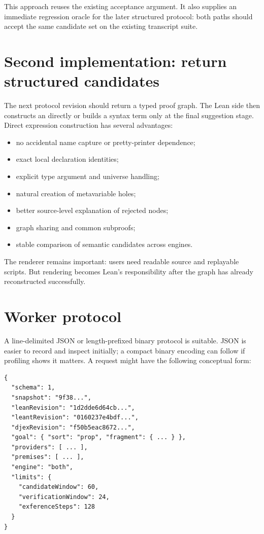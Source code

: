 \documentclass[11pt,letterpaper,openany]{report}
\newcommand{\code}[1]{\texttt{\detokenize{#1}}}
\begin{document}
This approach reuses the existing acceptance argument. It also supplies an immediate
regression oracle for the later structured protocol: both paths should accept the same
candidate set on the existing transcript suite.

\section{Second implementation: return structured candidates}

The next protocol revision should return a typed proof graph. The Lean side then
constructs an \code{Expr} directly or builds a syntax term only at the final suggestion
stage. Direct expression construction has several advantages:

\begin{itemize}
  \item no accidental name capture or pretty-printer dependence;
  \item exact local declaration identities;
  \item explicit type argument and universe handling;
  \item natural creation of metavariable holes;
  \item better source-level explanation of rejected nodes;
  \item graph sharing and common subproofs;
  \item stable comparison of semantic candidates across engines.
\end{itemize}

The renderer remains important: users need readable source and replayable scripts.
But rendering becomes Lean's responsibility after the graph has already reconstructed
successfully.

\section{Worker protocol}

A line-delimited JSON or length-prefixed binary protocol is suitable. JSON is easier to
record and inspect initially; a compact binary encoding can follow if profiling shows
it matters. A request might have the following conceptual form:

\begin{lstlisting}[language=JSONLite,caption={Illustrative Leant worker request}]
{
  "schema": 1,
  "snapshot": "9f38...",
  "leanRevision": "1d2dde6d64cb...",
  "leantRevision": "0160237e4bdf...",
  "djexRevision": "f50b5eac8672...",
  "goal": { "sort": "prop", "fragment": { ... } },
  "providers": [ ... ],
  "premises": [ ... ],
  "engine": "both",
  "limits": {
    "candidateWindow": 60,
    "verificationWindow": 24,
    "exferenceSteps": 128
  }
}
\end{lstlisting}
\end{document}

